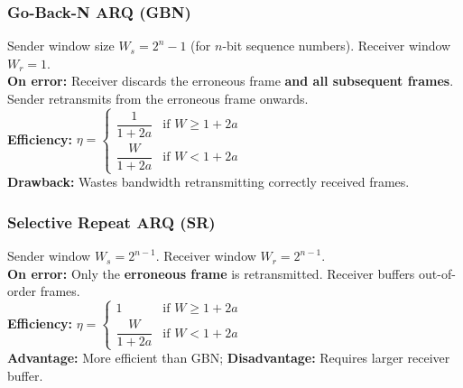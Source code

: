\documentclass[12pt,a4paper]{article}
\begin{document}
\begin{tcolorbox}[tikzbox, title={Stop-and-Wait ARQ --- Message Flow}]
\centering
{}
\end{tcolorbox}

\subsubsection*{Go-Back-N ARQ (GBN)}
\begin{tcolorbox}[formulabox, title={\textbf{Go-Back-N ARQ}}]
Sender window size $W_s = 2^n - 1$ (for $n$-bit sequence numbers). Receiver window $W_r = 1$.\\
\textbf{On error:} Receiver discards the erroneous frame \textbf{and all subsequent frames}. Sender retransmits from the erroneous frame onwards.\\[4pt]
\textbf{Efficiency:} $\eta = \begin{cases} \dfrac{1}{1+2a} & \text{if } W \geq 1+2a \\ \dfrac{W}{1+2a} & \text{if } W < 1+2a \end{cases}$\\[4pt]
\textbf{Drawback:} Wastes bandwidth retransmitting correctly received frames.
\end{tcolorbox}

\subsubsection*{Selective Repeat ARQ (SR)}
\begin{tcolorbox}[formulabox, title={\textbf{Selective Repeat ARQ}}]
Sender window $W_s = 2^{n-1}$. Receiver window $W_r = 2^{n-1}$.\\
\textbf{On error:} Only the \textbf{erroneous frame} is retransmitted. Receiver buffers out-of-order frames.\\[4pt]
\textbf{Efficiency:} $\eta = \begin{cases} 1 & \text{if } W \geq 1+2a \\ \dfrac{W}{1+2a} & \text{if } W < 1+2a \end{cases}$\\[4pt]
\textbf{Advantage:} More efficient than GBN; \textbf{Disadvantage:} Requires larger receiver buffer.
\end{tcolorbox}
\end{document}
